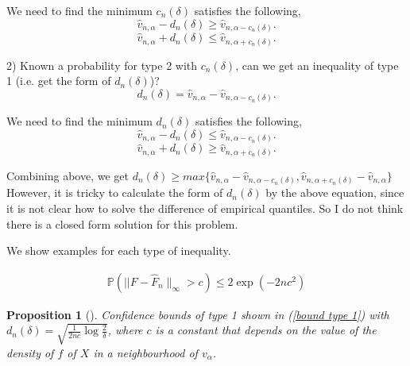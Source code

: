 \documentclass{article}
\theoremstyle{plain}
\newtheorem{prop}{Proposition}
\begin{document}
We need to find the minimum $c_n(\delta)$ satisfies the following,
$$\hat{v}_{n, \alpha} - d_n(\delta) \geq \hat{v}_{n, \alpha -c_n(\delta)}.$$
$$\hat{v}_{n, \alpha} + d_n(\delta) \leq \hat{v}_{n, \alpha + c_n(\delta)}.$$


2) Known a probability for type 2 with $c_n(\delta)$, can we get an inequality of type 1 (i.e. get the form of $d_n(\delta)$)?
$$d_n(\delta) = \hat{v}_{n, \alpha} - \hat{v}_{n, \alpha -c_n(\delta)}.$$

We need to find the minimum $d_n(\delta)$ satisfies the following,
$$\hat{v}_{n, \alpha} - d_n(\delta) \leq \hat{v}_{n, \alpha -c_n(\delta)}.$$
$$\hat{v}_{n, \alpha} + d_n(\delta) \geq \hat{v}_{n, \alpha + c_n(\delta)}.$$

Combining above, we get $d_n(\delta) \geq max \{\hat{v}_{n, \alpha} - \hat{v}_{n, \alpha -c_n(\delta)},   \hat{v}_{n, \alpha + c_n(\delta)} - \hat{v}_{n, \alpha}\}$\\

However, it is tricky to calculate the form of $d_n(\delta)$ by the above equation, since it is not clear how to solve the difference of empirical quantiles. So I do not think there is a closed form solution for this problem. 

We show examples for each type of inequality.

\begin{align}
    \mathbb{P} \left( ||F-\hat{F}_{n} \|_{\infty}>c\right) \leq 2 \exp \left(-2 n c^{2}\right)
\end{align}

\begin{prop}[\textcite{kolla_concentration_2019}] Confidence bounds of type 1 shown in (\ref{bound type 1}) with $d_n(\delta) = \sqrt{\frac{1}{2nc} \log \frac{2}{\delta}}$, where $c$ is a constant that depends on the value of the density of $f$ of $X$ in a neighbourhood of $v_\alpha$.
\end{prop}
\end{document}
